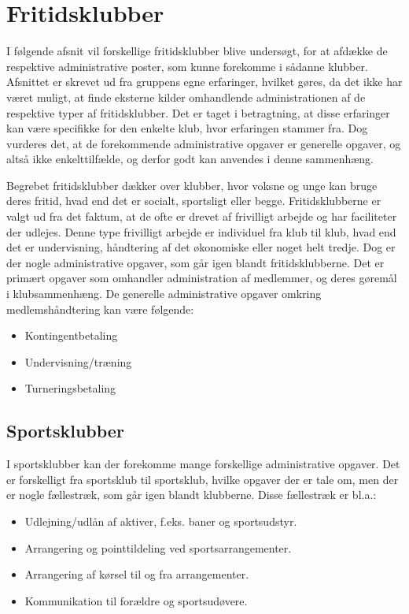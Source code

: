 \chapter{Fritidsklubber} \label{chap:Fritidsklubber}

I følgende afsnit vil forskellige fritidsklubber blive undersøgt, for at afdække de respektive administrative poster, som kunne forekomme i sådanne klubber. 
Afsnittet er skrevet ud fra gruppens egne erfaringer, hvilket gøres, da det ikke har været muligt, at finde eksterne kilder omhandlende administrationen af de respektive typer af fritidsklubber.
Det er taget i betragtning, at disse erfaringer kan være specifikke for den enkelte klub, hvor erfaringen stammer fra. 
Dog vurderes det, at de forekommende administrative opgaver er generelle opgaver, og altså ikke enkelttilfælde, og derfor godt kan anvendes i denne sammenhæng.

Begrebet fritidsklubber dækker over klubber, hvor voksne og unge kan bruge deres fritid, hvad end det er socialt, sportsligt eller begge. 
Fritidsklubberne er valgt ud fra det faktum, at de ofte er drevet af frivilligt arbejde og har faciliteter der udlejes. 
Denne type frivilligt arbejde er individuel fra klub til klub, hvad end det er undervisning, håndtering af det økonomiske eller noget helt tredje. 
Dog er der nogle administrative opgaver, som går igen blandt fritidsklubberne.
Det er primært opgaver som omhandler administration af medlemmer, og deres gøremål i klubsammenhæng.
De generelle administrative opgaver omkring medlemshåndtering kan være følgende:
\begin{itemize}
	\item Kontingentbetaling
	\item Undervisning/træning
	\item Turneringsbetaling
\end{itemize}

\section{Sportsklubber} \label{Sportsklubber}

I sportsklubber kan der forekomme mange forskellige administrative opgaver. 
Det er forskelligt fra sportsklub til sportsklub, hvilke opgaver der er tale om, men der er nogle fællestræk, som går igen blandt klubberne. 
Disse fællestræk er bl.a.:
\begin{itemize}
	\item Udlejning/udlån af aktiver, f.eks. baner og sportsudstyr. 
	\item Arrangering og pointtildeling ved sportsarrangementer.
	\item Arrangering af kørsel til og fra arrangementer.
	\item Kommunikation til forældre og sportsudøvere.
\end{itemize}

